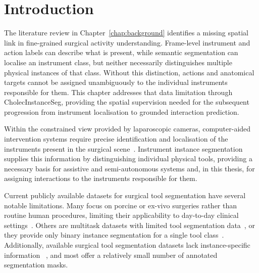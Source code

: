 \section{Introduction}
%
The literature review in Chapter~\ref{chap:background} identifies a missing spatial link in fine-grained surgical activity understanding. Frame-level instrument and action labels can describe what is present, while semantic segmentation can localise an instrument class, but neither necessarily distinguishes multiple physical instances of that class. Without this distinction, actions and anatomical targets cannot be assigned unambiguously to the individual instruments responsible for them. This chapter addresses that data limitation through CholecInstanceSeg, providing the spatial supervision needed for the subsequent progression from instrument localisation to grounded \ivttriplet interaction prediction.

Within the constrained view provided by laparoscopic cameras, computer-aided intervention systems require precise identification and localisation of the instruments present in the surgical scene~\cite{real_time_seg_adverserial,vecauteren_cai_4_cai,cv_in_surgery}. Instrument instance segmentation supplies this information by distinguishing individual physical tools, providing a necessary basis for assistive and semi-autonomous systems and, in this thesis, for assigning interactions to the instruments responsible for them.

Current publicly available datasets for surgical tool segmentation have several notable limitations.
Many focus on porcine or ex-vivo surgeries rather than routine human procedures, limiting their applicability to day-to-day clinical settings~\cite{bodenstedt2018comparative,endovis2017,endovis2018}.
Others are multitask datasets with limited tool segmentation data~\cite{autolaparo}, or they provide only binary instance segmentation for a single tool class~\cite{robustmis2019}. Additionally, available surgical tool segmentation datasets lack instance-specific information ~\cite{bodenstedt2018comparative,endovis2017,endovis2018,autolaparo,psychogyios2023sar,cholecseg8k}, and most offer a relatively small number of annotated segmentation masks. 




